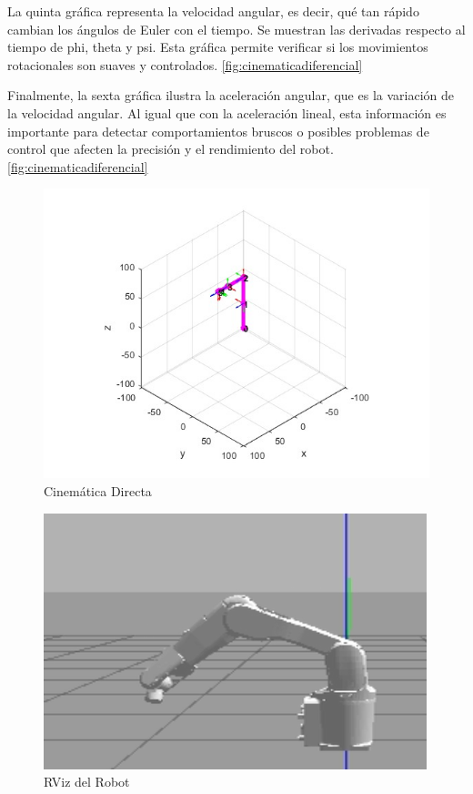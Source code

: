 La quinta gráfica representa la velocidad angular, es decir, qué tan rápido cambian los ángulos de Euler con el tiempo. Se muestran las derivadas respecto al tiempo de phi, theta y psi. Esta gráfica permite verificar si los movimientos rotacionales son suaves y controlados. \autoref{fig:cinematicadiferencial}

Finalmente, la sexta gráfica ilustra la aceleración angular, que es la variación de la velocidad angular. Al igual que con la aceleración lineal, esta información es importante para detectar comportamientos bruscos o posibles problemas de control que afecten la precisión y el rendimiento del robot. \autoref{fig:cinematicadiferencial}

\begin{figure}
	\centering
	\includegraphics[width=0.5\linewidth]{img/cinematicadirecta}
	\caption{Cinemática Directa}
	\label{fig:cinematicadirecta}
\end{figure}


\begin{figure}
	\centering
	\includegraphics[width=0.5\linewidth]{img/ROS1}
	\caption{RViz del Robot}
	\label{fig:ros1}
\end{figure}





